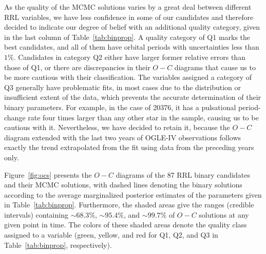 \documentclass[twocolumn,times]{aastex63}
\begin{document}
As the quality of the MCMC solutions varies by a great deal between different RRL variables, we have less confidence in some of our candidates
and therefore decided to indicate our degree of belief with an additional quality category, given in the last column of
Table~\ref{tab:binprop}. A quality category of Q1 marks the best candidates, and all of them have orbital periods with uncertainties less than $1\%$.
Candidates in category Q2 either have larger former relative errors than those of Q1, or there are discrepancies in their $O-C$ diagrams
that cause us to be more cautious with their classification.
The variables assigned a category of Q3 generally have problematic fits, in most cases due to the distribution or insufficient extent of the data,
which prevents the accurate determination of their binary parameters. For example, in the case of 20376, it has a pulsational
period-change rate four times larger than any other star in the sample, causing us to be cautious with it.
Nevertheless, we have decided to retain it, because the $O-C$ diagram extended with the last two
years of OGLE-IV observations follows exactly the trend extrapolated from the fit using data from the preceding years only.

Figure~\ref{fig:ocs} presents the $O-C$ diagrams of the 87 RRL binary candidates and their MCMC solutions, with dashed
lines denoting the binary solutions according to the average marginalized posterior estimates of the parameters given in Table~\ref{tab:binprop}.
Furthermore, the shaded areas give the ranges (credible intervals) containing $\sim 68.3\%$, $\sim 95.4\%$, and $\sim99.7\%$ of
$O-C$ solutions at any given point in time. The colors of these shaded areas denote the quality class assigned to a variable
(green, yellow, and red for Q1, Q2, and Q3 in Table~\ref{tab:binprop}, respectively).
\end{document}
